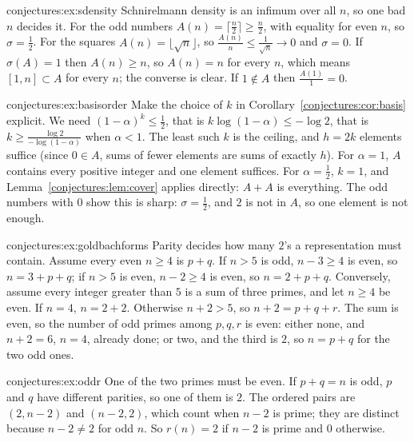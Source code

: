 \begin{solution}{conjectures:ex:sdensity}
\idea Schnirelmann density is an infimum over all $n$, so one bad $n$ decides it.
\writeup For the odd numbers $A(n)=\lceil\frac n2\rceil\ge\frac n2$, with equality for even $n$, so $\sigma=\frac12$. For the squares $A(n)=\lfloor\sqrt n\rfloor$, so
$\frac{A(n)}n\le\frac1{\sqrt n}\to0$ and $\sigma=0$. If $\sigma(A)=1$ then $A(n)\ge n$, so $A(n)=n$ for every $n$, which means $[1,n]\subset A$ for every $n$; the
converse is clear. If $1\notin A$ then $\frac{A(1)}1=0$.
\end{solution}

\begin{solution}{conjectures:ex:basisorder}
\idea Make the choice of $k$ in Corollary~\ref{conjectures:cor:basis} explicit.
\writeup We need $(1-\alpha)^k\le\frac12$, that is $k\log(1-\alpha)\le-\log2$, that is $k\ge\frac{\log2}{-\log(1-\alpha)}$ when $\alpha<1$. The least such $k$ is
the ceiling, and $h=2k$ elements suffice (since $0\in A$, sums of fewer elements are sums of exactly $h$). For $\alpha=1$, $A$ contains every positive integer
and one element suffices. For $\alpha=\frac12$, $k=1$, and Lemma~\ref{conjectures:lem:cover} applies directly: $A+A$ is everything. The odd numbers with $0$ show this
is sharp: $\sigma=\frac12$, and $2$ is not in $A$, so one element is not enough.
\end{solution}

\begin{solution}{conjectures:ex:goldbachforms}
\idea Parity decides how many $2$'s a representation must contain.
\writeup Assume every even $n\ge4$ is $p+q$. If $n>5$ is odd, $n-3\ge4$ is even, so $n=3+p+q$; if $n>5$ is even, $n-2\ge4$ is even, so $n=2+p+q$. Conversely,
assume every integer greater than $5$ is a sum of three primes, and let $n\ge4$ be even. If $n=4$, $n=2+2$. Otherwise $n+2>5$, so $n+2=p+q+r$. The sum is
even, so the number of odd primes among $p,q,r$ is even: either none, and $n+2=6$, $n=4$, already done; or two, and the third is $2$, so $n=p+q$ for the two
odd ones.
\end{solution}

\begin{solution}{conjectures:ex:oddr}
\idea One of the two primes must be even.
\writeup If $p+q=n$ is odd, $p$ and $q$ have different parities, so one of them is $2$. The ordered pairs are $(2,n-2)$ and $(n-2,2)$, which count when $n-2$
is prime; they are distinct because $n-2\ne2$ for odd $n$. So $r(n)=2$ if $n-2$ is prime and $0$ otherwise.
\end{solution}

